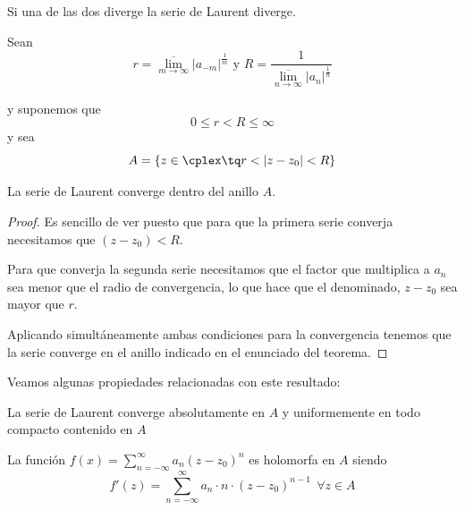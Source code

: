 \documentclass{apuntes}
\begin{document}
\obs Si una de las dos diverge la serie de Laurent diverge.

\begin{theorem}
Sean
\[r = \overline{\lim_{m \to \infty}}|a_{-m}|^\frac{1}{m} \text{ y } R = \frac{1}{\overline{\lim_{n \to \infty}}|a_{n}|^\frac{1}{n}}\]

y suponemos que
\[0 \leq r < R \leq \infty\]
y sea
\[A = \{z \in \cplex \tq r < |z-z_0|<R\}\]

La serie de Laurent converge dentro del anillo $A$.
\end{theorem}
\begin{proof}
Es sencillo de ver puesto que para que la primera serie converja necesitamos que $(z-z_0)< R$.

Para que converja la segunda serie necesitamos que el factor que multiplica a $a_n$ sea menor que el radio de convergencia, lo que hace que el denominado, $z-z_0$ sea mayor que $r$.

Aplicando simultáneamente ambas condiciones para la convergencia tenemos que la serie converge en el anillo indicado en el enunciado del teorema.
\end{proof}

Veamos algunas propiedades relacionadas con este resultado:
\begin{prop}
\item La serie de Laurent converge absolutamente en $A$ y uniformemente en todo compacto contenido en $A$
\item La función $f(x)=\sum_{n=-\infty}^{\infty}a_n(z-z_0)^n$ es holomorfa en $A$ siendo
\[f'(z)=\sum_{n=-\infty}^{\infty}a_n\cdot n \cdot (z-z_0)^{n-1} \ \ \forall z \in A\]
\end{prop}
\end{document}
